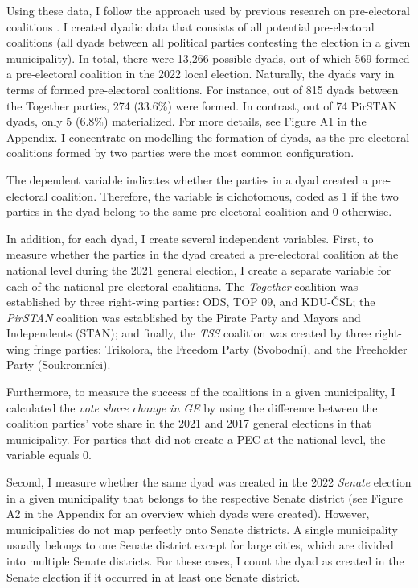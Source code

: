 \documentclass[]{interact}
\theoremstyle{plain}%
\theoremstyle{definition}
\theoremstyle{remark}
\begin{document}
Using these data, I follow the approach used by previous research on pre-electoral coalitions \citep{golder2005,ibenskas2016}. I created dyadic data that consists of all potential pre-electoral coalitions (all dyads between all political parties contesting the election in a given municipality). In total, there were 13,266 possible dyads, out of which 569 formed a pre-electoral coalition in the 2022 local election. Naturally, the dyads vary in terms of formed pre-electoral coalitions. For instance, out of 815 dyads between the Together parties, 274 (33.6\%) were formed. In contrast, out of 74 PirSTAN dyads, only 5 (6.8\%) materialized. For more details, see Figure A1 in the Appendix. I concentrate on modelling the formation of dyads, as the pre-electoral coalitions formed by two parties were the most common configuration.

The dependent variable indicates whether the parties in a dyad created a pre-electoral coalition. Therefore, the variable is dichotomous, coded as 1 if the two parties in the dyad belong to the same pre-electoral coalition and 0 otherwise. 

In addition, for each dyad, I create several independent variables. 
First, to measure whether the parties in the dyad created a pre-electoral coalition at the national level during the 2021 general election, I create a separate variable for each of the national pre-electoral coalitions. The \emph{Together} coalition was established by three right-wing parties: ODS, TOP 09, and KDU-ČSL; the \emph{PirSTAN} coalition was established by the Pirate Party and Mayors and Independents (STAN); and finally, the \emph{TSS} coalition was created by three right-wing fringe parties: Trikolora, the Freedom Party (Svobodní), and the Freeholder Party (Soukromníci). 

Furthermore, to measure the success of the coalitions in a given municipality, I calculated the \emph{vote share change in GE} by using the difference between the coalition parties' vote share in the 2021 and 2017 general elections in that municipality. For parties that did not create a PEC at the national level, the variable equals 0.

Second, I measure whether the same dyad was created in the 2022 \emph{Senate} election in a given municipality that belongs to the respective Senate district (see Figure A2 in the Appendix for an overview which dyads were created). However, municipalities do not map perfectly onto Senate districts. A single municipality usually belongs to one Senate district except for large cities, which are divided into multiple Senate districts. For these cases, I count the dyad as created in the Senate election if it occurred in at least one Senate district.
\end{document}

